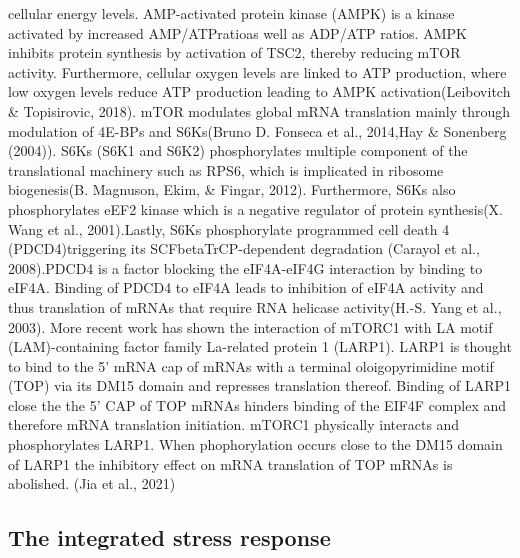\documentclass[12pt,openany]{book}
\begin{document}
cellular energy levels. AMP-activated protein kinase (AMPK) is a kinase
activated by increased AMP/ATPratioas well as ADP/ATP ratios. AMPK
inhibits protein synthesis by activation of TSC2, thereby reducing mTOR
activity. Furthermore, cellular oxygen levels are linked to ATP
production, where low oxygen levels reduce ATP production leading to
AMPK activation(Leibovitch \& Topisirovic, 2018). mTOR modulates global
mRNA translation mainly through modulation of 4E-BPs and S6Ks(Bruno D.
Fonseca et al., 2014,Hay \& Sonenberg (2004)). S6Ks (S6K1 and S6K2)
phosphorylates multiple component of the translational machinery such as
RPS6, which is implicated in ribosome biogenesis(B. Magnuson, Ekim, \&
Fingar, 2012). Furthermore, S6Ks also phosphorylates eEF2 kinase which
is a negative regulator of protein synthesis(X. Wang et al.,
2001).Lastly, S6Ks phosphorylate programmed cell death 4
(PDCD4)triggering its SCFbetaTrCP-dependent degradation (Carayol et al.,
2008).PDCD4 is a factor blocking the eIF4A-eIF4G interaction by binding
to eIF4A. Binding of PDCD4 to eIF4A leads to inhibition of eIF4A
activity and thus translation of mRNAs that require RNA helicase
activity(H.-S. Yang et al., 2003). More recent work has shown the
interaction of mTORC1 with LA motif (LAM)-containing factor family
La-related protein 1 (LARP1). LARP1 is thought to bind to the 5' mRNA
cap of mRNAs with a terminal oloigopyrimidine motif (TOP) via its DM15
domain and represses translation thereof. Binding of LARP1 close the the
5' CAP of TOP mRNAs hinders binding of the EIF4F complex and therefore
mRNA translation initiation. mTORC1 physically interacts and
phosphorylates LARP1. When phophorylation occurs close to the DM15
domain of LARP1 the inhibitory effect on mRNA translation of TOP mRNAs
is abolished. (Jia et al., 2021)

\subsection{The integrated stress response}
\end{document}
